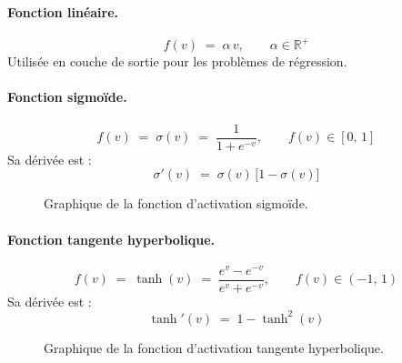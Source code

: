 \paragraph{Fonction linéaire.}
\begin{equation}
	f(v) \;=\; \alpha\,v, \qquad \alpha \in \mathbb{R}^+
\end{equation}
Utilisée en couche de sortie pour les problèmes de régression.

\paragraph{Fonction sigmoïde.}
\begin{equation}
	f(v) \;=\; \sigma(v) \;=\; \frac{1}{1 + e^{-v}},
	\qquad f(v) \in [0,\,1]
\end{equation}
Sa dérivée est :
\begin{equation}
	\sigma'(v) \;=\; \sigma(v)\,\bigl[1 - \sigma(v)\bigr]
\end{equation}

\begin{figure}[H]
	\begin{center}
	\end{center}
	\caption{Graphique de la fonction d'activation sigmoïde.}
\end{figure}

\paragraph{Fonction tangente hyperbolique.}
\begin{equation}
	f(v) \;=\; \tanh(v) \;=\;
	\frac{e^{v} - e^{-v}}{e^{v} + e^{-v}},
	\qquad f(v) \in (-1,\,1)
\end{equation}
Sa dérivée est :
\begin{equation}
	\tanh'(v) \;=\; 1 - \tanh^2(v)
\end{equation}

\begin{figure}[H]
	\begin{center}
	\end{center}
	\caption{Graphique de la fonction d'activation tangente hyperbolique.}
\end{figure}

